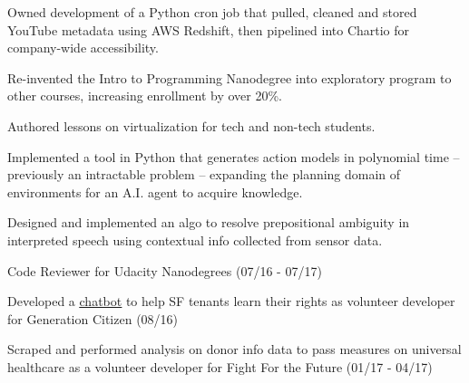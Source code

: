 \documentclass[]{deedy-resume-openfont}
\begin{document}
\begin{minipage}[t]{0.66\textwidth}
\begin{tightemize}

\item Owned development of a Python cron job that pulled, cleaned and stored YouTube metadata using AWS Redshift, then pipelined into Chartio for company-wide accessibility.
\item Re-invented the Intro to Programming Nanodegree into exploratory program to other courses, increasing enrollment by over 20\%.
\item Authored lessons on virtualization for tech and non-tech students.

\end{tightemize}
\sectionsep

\begin{tightemize}
\item Implemented a tool in Python that generates action models in polynomial time -- previously an intractable problem -- expanding the planning domain of environments for an A.I. agent to acquire knowledge.
\item Designed and implemented an algo to resolve prepositional ambiguity in interpreted speech using contextual info collected from sensor data.
\end{tightemize}
\sectionsep

\begin{tightemize}
\item Code Reviewer for Udacity Nanodegrees (07/16 - 07/17)
\item Developed a \color{blue}\underline{\href{https://github.com/rahul-nath/rentbot}{\color{blue}chatbot}} to help SF tenants learn their rights as volunteer developer for Generation Citizen (08/16)
\item Scraped and performed analysis on donor info data to pass measures on universal healthcare as a volunteer developer for Fight For the Future (01/17 - 04/17)
\end{tightemize}



\end{minipage}
\end{document}
